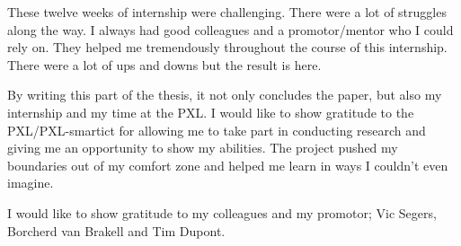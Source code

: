 These twelve weeks of internship were challenging. There were a lot of struggles along the way.
I always had good colleagues and a promotor/mentor who I could rely on.
They helped me tremendously throughout the course of this internship. There were a lot of ups 
and downs but the result is here.

By writing this part of the thesis, it not only concludes the paper, but also my internship and my time at the PXL. I would 
like to show gratitude to the PXL/PXL-smartict for allowing me to take part in conducting research and giving me an 
opportunity to show my abilities. The project pushed my boundaries out of my comfort zone and helped me learn in ways 
I couldn't even imagine.

I would like to show gratitude to my colleagues and my promotor; Vic Segers, Borcherd van Brakell and Tim Dupont.